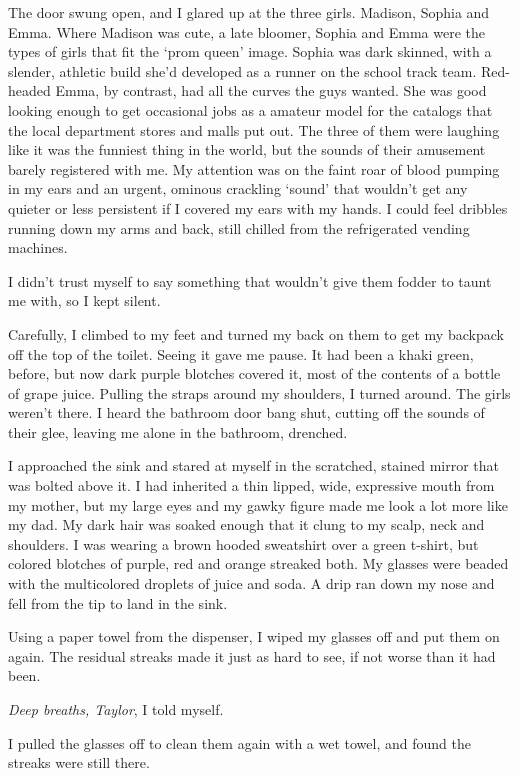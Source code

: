The door swung open, and I glared up at the three girls. Madison, Sophia and Emma. Where Madison was cute, a late bloomer, Sophia and Emma were the types of girls that fit the `prom queen' image. Sophia was dark skinned, with a slender, athletic build she'd developed as a runner on the school track team. Red-headed Emma, by contrast, had all the curves the guys wanted. She was good looking enough to get occasional jobs as a amateur model for the catalogs that the local department stores and malls put out. The three of them were laughing like it was the funniest thing in the world, but the sounds of their amusement barely registered with me. My attention was on the faint roar of blood pumping in my ears and an urgent, ominous crackling `sound' that wouldn't get any quieter or less persistent if I covered my ears with my hands. I could feel dribbles running down my arms and back, still chilled from the refrigerated vending machines.

I didn't trust myself to say something that wouldn't give them fodder to taunt me with, so I kept silent.

Carefully, I climbed to my feet and turned my back on them to get my backpack off the top of the toilet. Seeing it gave me pause. It had been a khaki green, before, but now dark purple blotches covered it, most of the contents of a bottle of grape juice. Pulling the straps around my shoulders, I turned around. The girls weren't there. I heard the bathroom door bang shut, cutting off the sounds of their glee, leaving me alone in the bathroom, drenched.

I approached the sink and stared at myself in the scratched, stained mirror that was bolted above it. I had inherited a thin lipped, wide, expressive mouth from my mother, but my large eyes and my gawky figure made me look a lot more like my dad. My dark hair was soaked enough that it clung to my scalp, neck and shoulders. I was wearing a brown hooded sweatshirt over a green t-shirt, but colored blotches of purple, red and orange streaked both. My glasses were beaded with the multicolored droplets of juice and soda. A drip ran down my nose and fell from the tip to land in the sink.

Using a paper towel from the dispenser, I wiped my glasses off and put them on again. The residual streaks made it just as hard to see, if not worse than it had been.

\emph{Deep breaths, Taylor}, I told myself.

I pulled the glasses off to clean them again with a wet towel, and found the streaks were still there.

